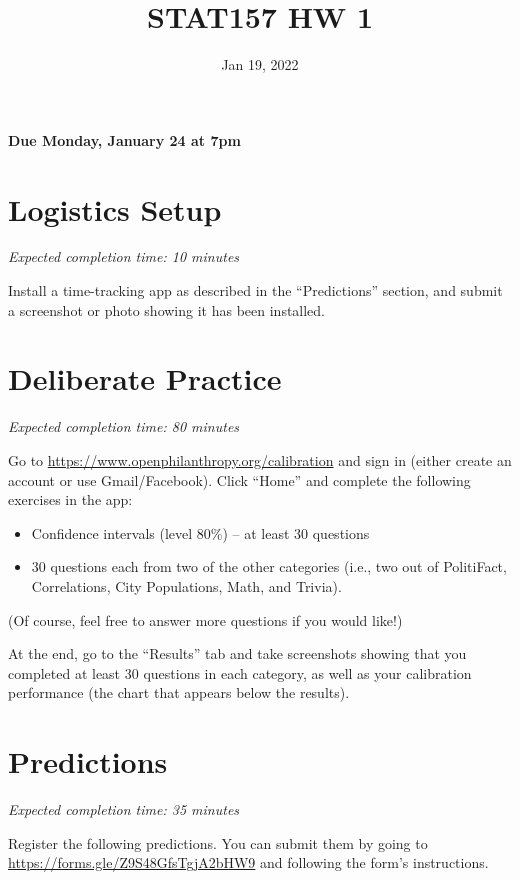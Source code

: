 \documentclass[11pt]{article}
\title{STAT157 HW 1}
\date{Jan 19, 2022}
\begin{document}
\maketitle

\hfill \textbf{Due Monday, January 24 at 7pm}

\section*{Logistics Setup}

\emph{Expected completion time: 10 minutes}

Install a time-tracking app as described in the ``Predictions'' section, and submit a screenshot or photo showing it has been 
installed.

\section*{Deliberate Practice}

\emph{Expected completion time: 80 minutes}

Go to \url{https://www.openphilanthropy.org/calibration} and sign in (either create an account or use 
Gmail/Facebook). Click ``Home'' and complete the following exercises in the app:

\begin{itemize}

\item Confidence intervals (level 80\%) -- at least 30 questions
\item 30 questions each from two of the other categories (i.e., two out of PolitiFact, Correlations, City Populations, Math, and Trivia).

\end{itemize}

(Of course, feel free to answer more questions if you would like!)

At the end, go to the ``Results'' tab and take screenshots showing that 
you completed at least 30 questions in each category, as well as your calibration 
performance (the chart that appears below the results).

\section*{Predictions}

\emph{Expected completion time: 35 minutes}

Register the following predictions. You can submit them by going to 
\url{https://forms.gle/Z9S48GfsTgjA2bHW9} and following the form's instructions.
\end{document}
